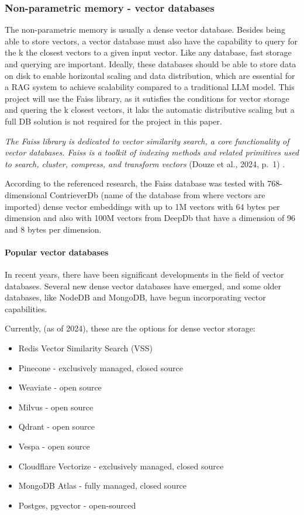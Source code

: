 \documentclass{wseas}
\begin{document}
\subsubsection{Non-parametric memory - vector
databases}

The non-parametric memory is usually a dense vector database. Besides
being able to store vectors, a vector database must also have the
capability to query for the k the closest vectors to a given input
vector. Like any database, fast storage and querying are important.
Ideally, these databases should be able to store data on disk to enable
horizontal scaling and data distribution, which are essential for a RAG
system to achieve scalability compared to a traditional LLM model. This
project will use the Faiss library, as it sutisfies the conditions for
vector storage and quering the k closest vectors, it laks the automatic
distributive scaling but a full DB solution is not required for the
project in this paper.

\emph{The Faiss library is dedicated to vector similarity search, a core
functionality of vector databases. Faiss is a toolkit of indexing
methods and related primitives used to search, cluster, compress, and
transform vectors} (Douze et al., 2024, p.~1) \cite{cite2}.

According to the referenced research, the Faiss database was tested with
768-dimensional ContrieverDb (name of the database from where vectors
are imported) dense vector embeddings with up to 1M vectors with 64
bytes per dimension and also with 100M vectors from DeepDb that have a
dimension of 96 and 8 bytes per dimension.

\paragraph{Popular vector databases}

In recent years, there have been significant developments in the field
of vector databases. Several new dense vector databases have emerged,
and some older databases, like NodeDB and MongoDB, have begun
incorporating vector capabilities.

Currently, (as of 2024), these are the options for dense vector storage:

\begin{itemize}

\item
  Redis Vector Similarity Search (VSS)
\item
  Pinecone - exclusively managed, closed source
\item
  Weaviate - open source
\item
  Milvus - open source
\item
  Qdrant - open source
\item
  Vespa - open source
\item
  Cloudflare Vectorize - exclusively managed, closed source
\item
  MongoDB Atlas - fully managed, closed source
\item
  Postges, pgvector - open-sourced
\end{itemize}
\end{document}
